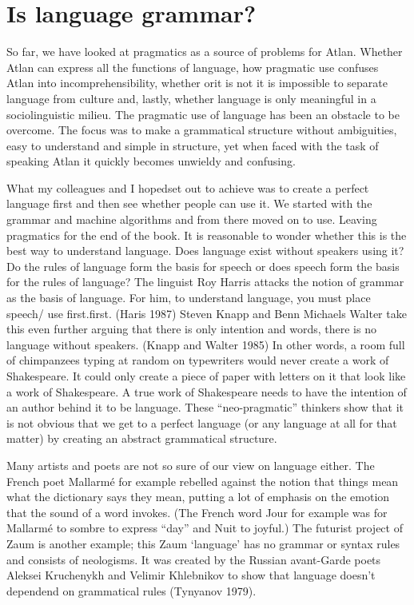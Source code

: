 \section{Is language grammar?}

So far, we have looked at pragmatics as a source of problems for Atlan. Whether Atlan can express all the functions of language, how pragmatic use confuses Atlan into incomprehensibility, whether orit is not it is impossible to separate language from culture and, lastly, whether language is only meaningful in a sociolinguistic milieu. The pragmatic use of language has been an obstacle to be overcome. The focus was to make a grammatical structure without ambiguities, easy to understand and simple in structure, yet when faced with the task of speaking Atlan it quickly becomes unwieldy and confusing.			 

What my colleagues and I hopedset out to achieve was to create a perfect language first and then see whether people can use it.  We started with the grammar and machine algorithms and from there moved on to use. Leaving pragmatics for the end of the book. It is reasonable to wonder whether this is the best way to understand language. Does language exist without speakers using it? Do the rules of language form the basis for speech or does speech form the basis for the rules of language? The linguist Roy Harris attacks the notion of grammar as the basis of language. For him, to understand language, you must place speech/ use first.first. (Haris 1987) Steven Knapp and Benn Michaels Walter take this even further arguing that there is only intention and words, there is no language without speakers. (Knapp and Walter 1985) In other words, a room full of chimpanzees typing at random on typewriters would never create a work of Shakespeare. It could only create a piece of paper with letters on it that look like a work of Shakespeare. A true work of Shakespeare needs to have the intention of an author behind it to be language. These “neo-pragmatic” thinkers show that it is not obvious that we get to a perfect language (or any language at all for that matter) by creating an abstract grammatical structure. 

Many artists and poets are not so sure of our view on language either. The French poet Mallarmé for example rebelled against the notion that things mean what the dictionary says they mean, putting a lot of emphasis on the emotion that the sound of a word invokes. (The French word Jour for example was for Mallarmé to sombre to express “day” and Nuit to joyful.) The futurist project of Zaum is another example; this Zaum ‘language’ has no grammar or syntax rules and consists of neologisms. It was created by the Russian avant-Garde poets Aleksei Kruchenykh and Velimir Khlebnikov to show that language doesn't dependend on grammatical rules (Tynyanov 1979).						 

